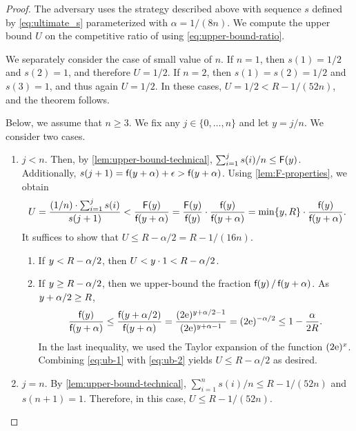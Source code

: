 \begin{proof}
The adversary uses the strategy described above
with sequence $s$ defined by \eqref{eq:ultimate_s} parameterized
with $\alpha = 1/(8n)$. We compute the upper bound $U$ on the competitive ratio
of \DET using \eqref{eq:upper-bound-ratio}.

We separately consider the case of small value of $n$.
If $n = 1$, then $s(1) = 1/2$ and $s(2) = 1$, and therefore 
$U = 1/2$. If $n = 2$, then $s(1) = s(2) = 1/2$ and $s(3) = 1$,
and thus again $U = 1/2$. In these cases, $U = 1/2 < R - 1/(52n)$, and 
the theorem follows. 

Below, we assume that $n \geq 3$.
We fix any $j \in \{0, \ldots, n\}$ and let $y = j/n$.
We consider two cases. 

\begin{enumerate}
\item $j < n$. 
Then, by \cref{lem:upper-bound-technical}, $\sum_{i=1}^j s(i)/n \leq \textsf{F}(y)$. 
Additionally, $s(j+1) = \textsf{f}(y+\alpha) + \epsilon > \textsf{f}(y + \alpha)$. 
Using \cref{lem:F-properties}, we obtain
\begin{equation}
\label{eq:ub-1}
U = \frac{ (1/n) \cdot \sum_{i = 1}^{j} s(i)}{s(j+1)}
  < \frac{\textsf{F}(y)}{\textsf{f}(y + \alpha)} 
  = \frac{\textsf{F}(y)}{\textsf{f}(y)} \cdot \frac{\textsf{f}(y)}{\textsf{f}(y + \alpha)} 
  = \min\{y, R\} \cdot \frac{\textsf{f}(y)}{\textsf{f}(y + \alpha)}.
\end{equation}
It suffices to show that $U \leq R - \alpha/2 = R - 1/(16n)$. 
\begin{enumerate}
\item If $y < R - \alpha/2$, then $U < y \cdot 1 < R - \alpha/2$.
\item If $y \geq R - \alpha/2$, then we upper-bound the fraction
$\textsf{f}(y) \,/\, \textsf{f}(y + \alpha)$. As $y + \alpha/2 \geq R$,
\begin{equation}
\label{eq:ub-2}
  \frac{\textsf{f}(y)}{\textsf{f}(y+\alpha)} 
  \leq \frac{\textsf{f}(y+\alpha/2)}{\textsf{f}(y+\alpha)} 
  = \frac{(2\mathrm{e})^{y+\alpha/2-1}}{(2\mathrm{e})^{y+\alpha-1}} 
  = (2\mathrm{e})^{-\alpha/2}
  \leq 1-\frac{\alpha}{2R}.
\end{equation}
In the last inequality, we used the Taylor expansion of the function $(2\mathrm{e})^x$.
Combining \eqref{eq:ub-1} with \eqref{eq:ub-2} yields 
$U \leq R - \alpha/2$ as desired.
\end{enumerate}

\item $j = n$.
By \cref{lem:upper-bound-technical}, 
$\sum_{i=1}^n s(i)/n \leq R - 1/(52n)$ and $s(n+1) = 1$.
Therefore, in this case, $U \leq R - 1/(52n)$.
\qedhere
\end{enumerate}
\end{proof}


